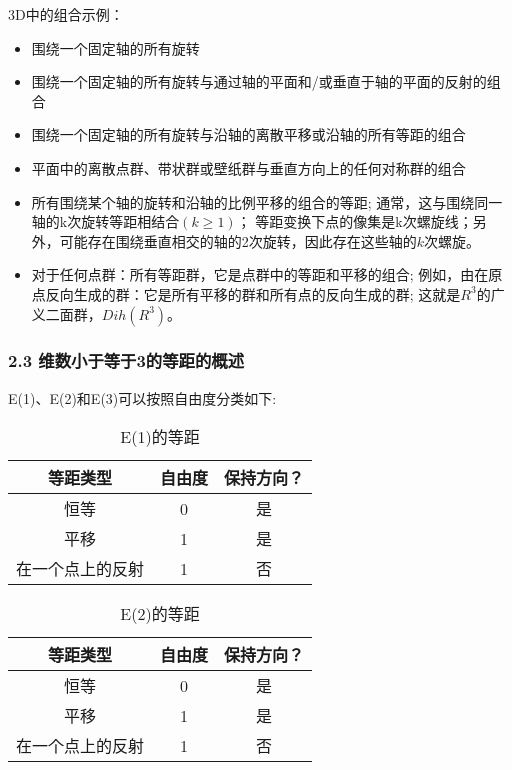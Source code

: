 3D中的组合示例：

\begin{itemize}
\item 围绕一个固定轴的所有旋转
\item 围绕一个固定轴的所有旋转与通过轴的平面和/或垂直于轴的平面的反射的组合
\item 围绕一个固定轴的所有旋转与沿轴的离散平移或沿轴的所有等距的组合
\item 平面中的离散点群、带状群或壁纸群与垂直方向上的任何对称群的组合
\item 所有围绕某个轴的旋转和沿轴的比例平移的组合的等距; 通常，这与围绕同一轴的k次旋转等距相结合$(k \geq 1)$； 等距变换下点的像集是k次螺旋线；另外，可能存在围绕垂直相交的轴的2次旋转，因此存在这些轴的$k$次螺旋。
\item 对于任何点群：所有等距群，它是点群中的等距和平移的组合; 例如，由在原点反向生成的群：它是所有平移的群和所有点的反向生成的群; 这就是$R^3$的广义二面群，$Dih(R^3)$。
\end{itemize}

\subsubsection{2.3 维数小于等于3的等距的概述}

E(1)、E(2)和E(3)可以按照自由度分类如下:

\begin{table}[ht]
\centering
\caption{E(1)的等距}\label{tab_OJLDQ}
\begin{tabular}{|c|c|c}
\hline
\textbf{等距类型} & \textbf{自由度} & \textbf{保持方向？} \\
\hline
恒等 & 0 & 是 \\
\hline
平移 & 1 & 是 \\
\hline
在一个点上的反射 & 1 & 否 \\
\hline
\end{tabular}
\end{table}

\begin{table}[ht]
\centering
\caption{E(2)的等距}\label{tab_OJLDQ_1}
\begin{tabular}{|c|c|c}
\hline
\textbf{等距类型} & \textbf{自由度} & \textbf{保持方向？} \\
\hline
恒等 & 0 & 是 \\
\hline
平移 & 1 & 是 \\
\hline
在一个点上的反射 & 1 & 否 \\
\hline
\end{tabular}
\end{table}

